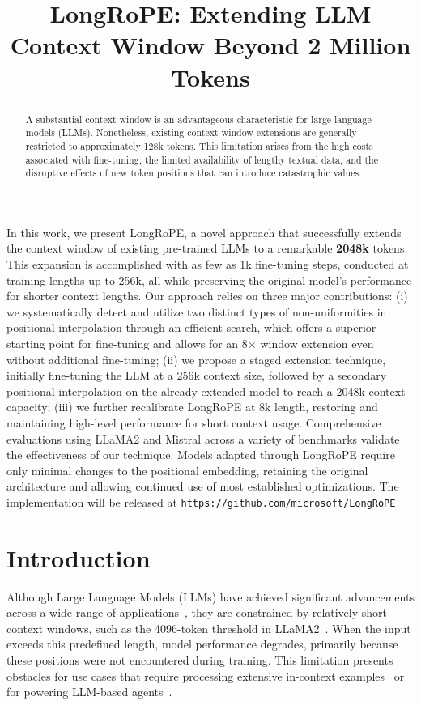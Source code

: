 \title{LongRoPE: Extending LLM Context Window Beyond 2 Million Tokens}

\begin{abstract}
A substantial context window is an advantageous characteristic for large language models (LLMs). Nonetheless, existing context window extensions are generally restricted to approximately 128k tokens. This limitation arises from the high costs associated with fine-tuning, the limited availability of lengthy textual data, and the disruptive effects of new token positions that can introduce catastrophic values.
\end{abstract}

In this work, we present LongRoPE, a novel approach that successfully extends the context window of existing pre-trained LLMs to a remarkable \textbf{2048k} tokens. This expansion is accomplished with as few as 1k fine-tuning steps, conducted at training lengths up to 256k, all while preserving the original model’s performance for shorter context lengths. Our approach relies on three major contributions: (i) we systematically detect and utilize two distinct types of non-uniformities in positional interpolation through an efficient search, which offers a superior starting point for fine-tuning and allows for an 8$\times$ window extension even without additional fine-tuning; (ii) we propose a staged extension technique, initially fine-tuning the LLM at a 256k context size, followed by a secondary positional interpolation on the already-extended model to reach a 2048k context capacity; (iii) we further recalibrate LongRoPE at 8k length, restoring and maintaining high-level performance for short context usage. Comprehensive evaluations using LLaMA2 and Mistral across a variety of benchmarks validate the effectiveness of our technique. Models adapted through LongRoPE require only minimal changes to the positional embedding, retaining the original architecture and allowing continued use of most established optimizations. The implementation will be released at \texttt{https://github.com/microsoft/LongRoPE}

\section{Introduction}

Although Large Language Models (LLMs) have achieved significant advancements across a wide range of applications~\cite{gpt4,llama2}, they are constrained by relatively short context windows, such as the 4096-token threshold in LLaMA2~\cite{llama2}. When the input exceeds this predefined length, model performance degrades, primarily because these positions were not encountered during training. This limitation presents obstacles for use cases that require processing extensive in-context examples~\cite{Huang2023FewerIM} or for powering LLM-based agents~\cite{park2023generative,madaan2023selfrefine}.

